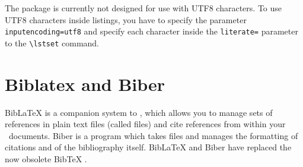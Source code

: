 The  package is currently not designed for use with
UTF8 characters. To use UTF8 characters inside listings, you have to
specify the parameter \lstinline!inputencoding=utf8! and 
specify each character inside the \lstinline!literate=! parameter
to the \lstinline!\lstset! command.








\section{Biblatex and Biber}

BibLaTeX \parencite{BibLaTeX} is a companion system to \LaTeXe, which
allows you to manage sets of references in plain text files (called
 files) and cite references from within your
\LaTeXe\ documents.  Biber \parencite{Biber} is a program which takes
 files and manages the formatting of citations and of the
bibliography itself. BibLaTeX and Biber have replaced the now obsolete
BibTeX \parencite{BibTeX}.

